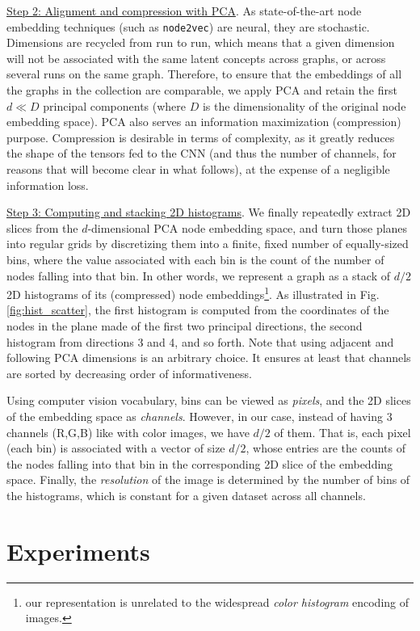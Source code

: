 \documentclass[runningheads]{llncs}
\begin{document}
\underline{Step 2: Alignment and compression with PCA}. As state-of-the-art node embedding techniques (such as \texttt{node2vec}) are neural, they are stochastic. Dimensions are recycled from run to run, which means that a given dimension will not be associated with the same latent concepts across graphs, or across several runs on the same graph. Therefore, to ensure that the embeddings of all the graphs in the collection are comparable, we apply PCA and retain the first $d \ll D$ principal components (where $D$ is the dimensionality of the original node embedding space). PCA also serves an information maximization (compression) purpose. Compression is desirable in terms of complexity, as it greatly reduces the shape of the tensors fed to the CNN (and thus the number of channels, for reasons that will become clear in what follows), at the expense of a negligible information loss.

\underline{Step 3: Computing and stacking 2D histograms}. We finally repeatedly extract 2D slices from the $d$-dimensional PCA node embedding space, and turn those planes into regular grids by discretizing them into a finite, fixed number of equally-sized bins, where the value associated with each bin is the count of the number of nodes falling into that bin. In other words, we represent a graph as a stack of $d/2$ 2D histograms of its (compressed) node embeddings\footnote{\scriptsize{our representation is unrelated to the widespread \textit{color histogram} encoding of images.}}. As illustrated in Fig. \ref{fig:hist_scatter}, the first histogram is computed from the coordinates of the nodes in the plane made of the first two principal directions, the second histogram from directions 3 and 4, and so forth. Note that using adjacent and following PCA dimensions is an arbitrary choice. It ensures at least that channels are sorted by decreasing order of informativeness.

Using computer vision vocabulary, bins can be viewed as \textit{pixels}, and the 2D slices of the embedding space as \textit{channels}. However, in our case, instead of having 3 channels (R,G,B) like with color images,  we have $d/2$ of them. That is, each pixel (each bin) is associated with a vector of size $d/2$, whose entries are the counts of the nodes falling into that bin in the corresponding 2D slice of the embedding space. Finally, the \textit{resolution} of the image is determined by the number of bins of the histograms, which is constant for a given dataset across all channels.

\section{Experiments}
\end{document}
